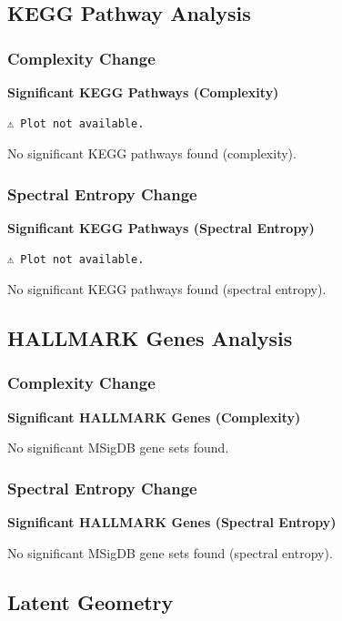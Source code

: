 \documentclass[
  letterpaper,
  DIV=11,
  numbers=noendperiod,
  openany,
  oneside]{scrreprt}
\begin{document}
\subsection{KEGG Pathway Analysis}

\subsubsection{Complexity Change}

\textbf{Significant KEGG Pathways (Complexity)}

\begin{verbatim}
⚠️ Plot not available.
\end{verbatim}

No significant KEGG pathways found (complexity).

\subsubsection{Spectral Entropy Change}

\textbf{Significant KEGG Pathways (Spectral Entropy)}

\begin{verbatim}
⚠️ Plot not available.
\end{verbatim}

No significant KEGG pathways found (spectral entropy).

\subsection{HALLMARK Genes Analysis}

\subsubsection{Complexity Change}

\textbf{Significant HALLMARK Genes (Complexity)}

No significant MSigDB gene sets found.

\subsubsection{Spectral Entropy Change}

\textbf{Significant HALLMARK Genes (Spectral Entropy)}

No significant MSigDB gene sets found (spectral entropy).

\subsection{Latent Geometry}
\end{document}

